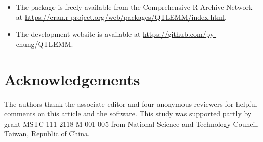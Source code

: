 \begin{itemize}
\item The  package is freely available from the Comprehensive R Archive Network at \url{https://cran.r-project.org/web/packages/QTLEMM/index.html}.
\item The development website is available at \url{https://github.com/py-chung/QTLEMM}.
\end{itemize}

\section{Acknowledgements}

The authors thank the associate editor and four anonymous reviewers for helpful comments on this article and the software. This study was supported partly by grant MSTC 111-2118-M-001-005 from National Science and Technology Council, Taiwan, Republic of China.



\address{Ping-Yuan Chung\\
	Institute of Statistical Science, Academia Sinica\\
	Taipei 11529, Taiwan, Republic of China\\
	}

\address{You-Tsz Guo\\
	Institute of Statistical Science, Academia Sinica\\
	Taipei 11529, Taiwan, Republic of China\\
	}

\address{Hsiang-An Ho\\
	Institute of Statistical Science, Academia Sinica\\
	Taipei 11529, Taiwan, Republic of China\\
	}

\address{Hsin-I Lee\\
	Institute of Statistical Science, Academia Sinica\\
	Taipei 11529, Taiwan, Republic of China\\
	}

\address{Po-Ya Wu\\
	Institute of Statistical Science, Academia Sinica\\
	Taipei 11529, Taiwan, Republic of China\\
	}

